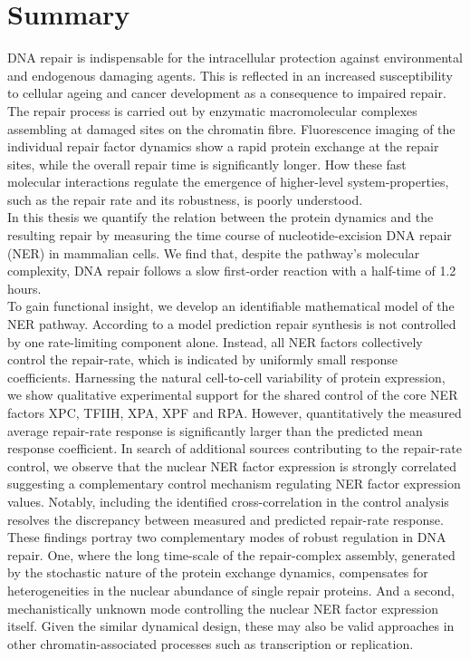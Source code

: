 \chapter*{Summary}
\thispagestyle{plain2}





DNA repair is indispensable for the intracellular protection against environmental and endogenous damaging agents. This is reflected in an increased susceptibility to cellular ageing and cancer development as a consequence to impaired repair. The repair process is carried out by enzymatic macromolecular complexes assembling at damaged sites on the chromatin fibre. Fluorescence imaging of the individual repair factor dynamics show a rapid protein exchange at the repair sites, while the overall repair time is significantly longer. How these fast molecular interactions regulate the emergence of higher-level system-properties, such as the repair rate and its robustness, is poorly understood.\\ 
In this thesis we quantify the relation between the protein dynamics and the resulting repair by measuring the time course of nucleotide-excision DNA repair (NER) in mammalian cells. We find that, despite the pathway's molecular complexity, DNA repair follows a slow first-order reaction with a half-time of 1.2 hours. \\
To gain functional insight, we develop an identifiable mathematical model of the NER pathway. According to a model prediction repair synthesis is not controlled by one rate-limiting component alone. Instead, all NER factors collectively control the repair-rate, which is indicated by uniformly small response coefficients. Harnessing the natural cell-to-cell variability of protein expression, we show qualitative experimental support for the shared control of the core NER factors XPC, TFIIH, XPA, XPF and RPA. However, quantitatively the measured average repair-rate response is significantly larger than the predicted mean response coefficient. In search of additional sources contributing to the repair-rate control, we observe that the nuclear NER factor expression is strongly correlated suggesting a complementary control mechanism regulating NER factor expression values. Notably, including the identified cross-correlation in the control analysis resolves the discrepancy between measured and predicted repair-rate response.\\  
These findings portray two complementary modes of robust regulation in DNA repair. One, where the long time-scale of the repair-complex assembly, generated by the stochastic nature of the protein exchange dynamics, compensates for heterogeneities in the nuclear abundance of single repair proteins. And a second, mechanistically unknown mode controlling the nuclear NER factor expression itself. Given the similar dynamical design, these may also be valid approaches in other chromatin-associated processes such as transcription or replication.    



      
 


%